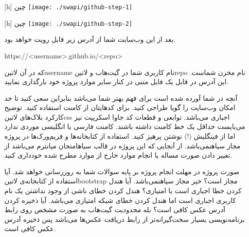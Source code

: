 [h]
  ‌چین
  \texttt{[image: ./swapi/github-step-1]}

[h]
  ‌چین
  \texttt{[image: ./swapi/github-step-2]}

بعد از این وب‌سایت شما از آدرس زیر قابل رویت خواهد بود.

\begin{latin}\begin{center}
https://<username>.github.io/<repo>
\end{center}\end{latin}

که در آن ‌لاتین{username} نام کاربری شما در گیت‌هاب و ‌لاتین{repo} نام مخزن شماست. این آدرس در قابل یک فایل متنی در کنار سایر موارد پروژه خود بارگذاری نمایید.


 آنچه در شما آورده شده است برای فهم بهتر شما می‌باشد بنابراین سعی کنید تا حد امکان وب‌سایت را گویا طراحی کنید.
 برای کدهایتان از کامنت استفاده کنید. توضیح کارکرد بلاک‌های ‌لاتین{css} اجباری می‌باشد. توابعی و قطعات کد جاوا اسکریپت نیز می‌بایست حداقل یک خط کامنت داشته باشند.
 کامنت فارسی یا انگلیسی موردی ندارد اما از فینگلیش (!) نوشتن پرهیز کنید.
 استفاده از کتابخانه‌ها و فریم‌ورک‌ها در پروژه مجاز ‌سیاه{نمی‌باشد}.
 از آنجایی که این پروژه در قالب ‌سیاه{امتحان میانترم} می‌باشد از تغییر دادن صورت مساله یا انجام موارد خارج از موارد مطرح شده خودداری کنید.


صورت پروژه در مهلت انجام پروژه بر پایه سوالات شما به روزرسانی خواهد شد.
 آیا استفاده از کتابخانه‌ی ‌لاتین{bootstrap} مجاز است؟
 خیر مجاز ‌سیاه{نمی‌باشد}.
 آیا هندل کردن خطا اجباری است یا امتیازی؟
 هندل کردن خطای ناشی از وجود نداشتن یک نام کاربری اجباری است اما هندل کردن خطای شبکه امتیازی می‌باشد.
 آیا ذخیره کردن آدرس عکس کافی است؟
 بله محدودیت گیت‌هاب به صورت مشخص روی رابط برنامه‌نویسی بسیار سخت‌گیرانه‌تر از رابط دریافت عکس‌ها می‌باشد پس ذخیره آدرس عکس کافی است.
